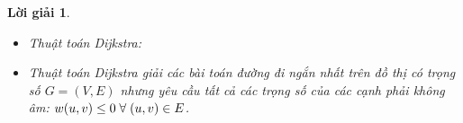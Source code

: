 \documentclass[14pt, a4paper]{article}
\theoremstyle{sltheorem}
\theoremstyle{soltheorem}
\newtheorem*{loigiai}{Lời giải}
\begin{document}
\begin{loigiai}
\begin{itemize}
\begin{itemize}
\begin{algorithm}[h!]

                    \caption{Thuật toán Bellman-Ford}
                    \label{alg:Bellman-Ford}
                \end{algorithm}

                Để truy vết tìm đường đi ngắn nhất từ đỉnh bắt đầu $s$ đến đỉnh $v$ (giả sử đồ thị $G$ không tồn tại một chu trình âm),
                ta sử dụng mảng $p$ đã được xây dựng ở thuật toán \ref{alg:Bellman-Ford}:

                \begin{algorithm}[h!]
                    \DontPrintSemicolon
                    
                    $path \gets \lbrack \rbrack$\;
                    $u \gets v$\;
                    $path \gets reverse(path)$\;
                    \;
                    \caption{Truy vết thuật toán Bellman-Ford}
                    \label{alg:Bellman-Ford-Trace}
                \end{algorithm}
                \item Thuật toán Dijkstra:
                \item 
                Thuật toán Dijkstra giải các bài toán đường đi ngắn nhất trên đồ thị có trọng số
                $G=(V, E)$ nhưng yêu cầu tất cả các trọng số của các cạnh phải không âm: $w(u, v) \leq 0 \thickspace \forall \thickspace (u, v) \in E$.
                

\end{itemize}
\end{itemize}
\end{loigiai}
\end{document}
